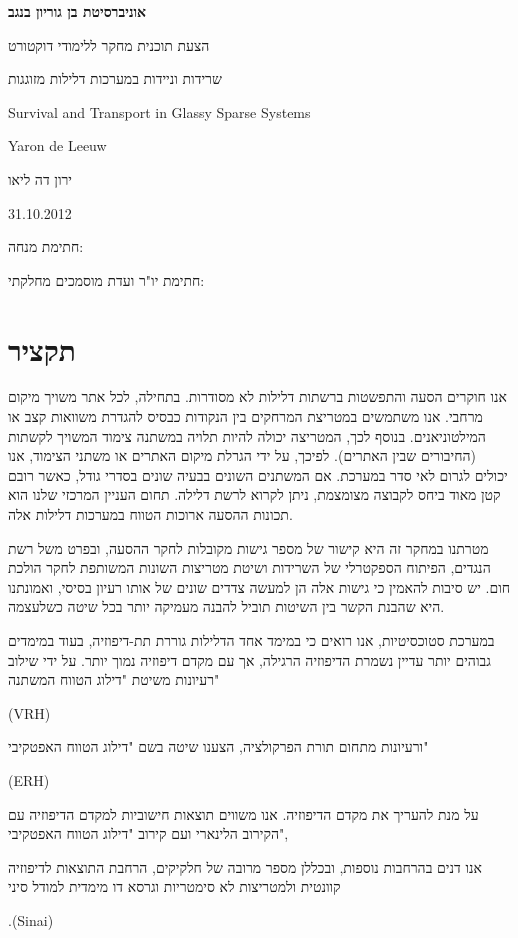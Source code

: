 \documentclass[onecolumn,fleqn,12pt,openany,a4paper,longbibliography,oneside]{book}
\begin{document}
{\setlength{\parindent}{0cm}
\begin{center}

{\Huge\bfseries
אוניברסיטת בן גוריון בנגב


הצעת תוכנית מחקר ללימודי דוקטורט
\vspace{6em}



שרידות וניידות במערכות דלילות מזוגגות




\begin{english}

Survival and Transport in Glassy Sparse Systems

\vspace{2em}

Yaron de Leeuw
\end{english}

ירון דה ליאו


31.10.2012

}%
\end{center}
\vspace{8em}

חתימת מנחה: 
\underline{\hspace{20ex}}


חתימת יו"ר ועדת מוסמכים מחלקתי:
\underline{\hspace{20ex}}
}%
\newpage
\section*{תקציר}
אנו חוקרים הסעה והתפשטות ברשתות דלילות לא מסודרות. בתחילה, לכל אתר משויך מיקום מרחבי. 
אנו משתמשים במטריצת המרחקים בין הנקודות כבסיס להגדרת משוואות קצב או המילטוניאנים.
בנוסף לכך, המטריצה יכולה להיות תלויה במשתנה צימוד המשויך לקשתות (החיבורים שבין האתרים).
לפיכך, על ידי הגרלת מיקום האתרים או משתני הצימוד, אנו יכולים לגרום לאי סדר במערכת.
אם המשתנים השונים בבעיה שונים בסדרי גודל, כאשר רובם קטן מאוד ביחס לקבוצה מצומצמת, 
ניתן לקרוא לרשת דלילה. תחום העניין המרכזי שלנו הוא תכונות ההסעה ארוכות הטווח במערכות דלילות אלה.


מטרתנו במחקר זה היא קישור של מספר גישות מקובלות לחקר ההסעה,
ובפרט משל רשת הנגדים, הפיתוח הספקטרלי של השרידות
ושיטת מטריצות השונות המשותפת לחקר הולכת חום.
יש סיבות להאמין כי גישות אלה הן למעשה צדדים שונים
של אותו רעיון בסיסי, ואמונתנו היא שהבנת הקשר בין השיטות
תוביל להבנה מעמיקה יותר בכל שיטה כשלעצמה.


במערכת סטוכסיטיות, אנו
רואים כי במימד אחד הדלילות גוררת תת-דיפוזיה,
בעוד במימדים גבוהים יותר עדיין נשמרת הדיפוזיה הרגילה,
אך עם מקדם דיפוזיה נמוך יותר.
על ידי שילוב רעיונות משיטת "דילוג הטווח המשתנה" 
\begin{english}
(VRH)
\end{english}
ורעיונות מתחום תורת הפרקולציה,
הצענו שיטה בשם "דילוג הטווח האפטקיבי"
\begin{english}
(ERH)
\end{english}
 על מנת להעריך את מקדם הדיפוזיה.
אנו משווים תוצאות חישוביות למקדם הדיפוזיה עם הקירוב הלינארי ועם קירוב "דילוג הטווח האפטקיבי",



אנו דנים בהרחבות נוספות, ובכללן מספר מרובה של חלקיקים, 
הרחבת התוצאות לדיפוזיה קוונטית ולמטריצות לא סימטריות
וגרסא דו מימדית למודל סיני
\begin{english}
.(Sinai)
\end{english}
\end{document}
